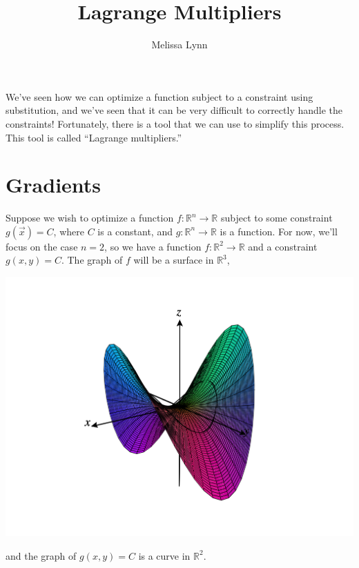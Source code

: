 \documentclass{ximera}
\title{Lagrange Multipliers}
\author{Melissa Lynn}
\begin{document}
\begin{abstract}
\end{abstract}
\maketitle

We've seen how we can optimize a function subject to a constraint using substitution, and we've seen that it can be very difficult to correctly handle the constraints! Fortunately, there is a tool that we can use to simplify this process. This tool is called ``Lagrange multipliers.''

\section*{Gradients}

Suppose we wish to optimize a function $f:\mathbb{R}^n\rightarrow\mathbb{R}$ subject to some constraint $g(\vec{x}) = C$, where $C$ is a constant, and $g:\mathbb{R}^n\rightarrow\mathbb{R}$ is a function. For now, we'll focus on the case $n=2$, so we have a function $f:\mathbb{R}^2\rightarrow\mathbb{R}$ and a constraint $g(x,y) = C$. The graph of $f$ will be a surface in $\mathbb{R}^3$, 

\begin{image}
\includegraphics[width = \textwidth]{CalcPlot3D-surface}
\end{image}

and the graph of $g(x,y) = C$ is a curve in $\mathbb{R}^2$.

\begin{image}
\end{image}
\end{document}

